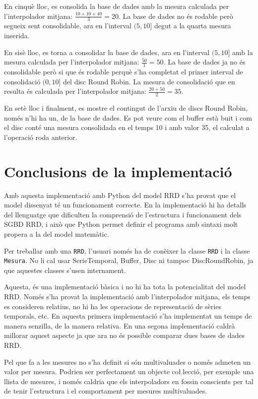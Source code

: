 En cinquè lloc, es consolida la base de dades amb la mesura calculada per l'interpolador mitjana: $\frac{10+10+40}{3}=20$. La base de dades no és rodable però segueix sent consolidable, ara en l'interval $(5,10]$ degut a la quarta mesura inserida.

En sisè lloc, es torna a consolidar la base de dades, ara en l'interval $(5,10]$ amb la mesura calculada per l'interpolador mitjana: $\frac{50}{1}=50$. La base de dades ja no és consolidable però si que és rodable perquè s'ha completat el primer interval de consolidació $(0,10]$ del disc Round Robin. La mesura de consolidació que en resulta és calculada per l'interpolador mitjana: $\frac{ 20+50 }{2} = 35$.

En setè lloc i finalment, es mostre el contingut de l'arxiu de discs Round Robin, només n'hi ha un, de la base de dades. Es pot veure com el buffer està buit i com el disc conté una mesura consolidada en el temps 10 i amb valor 35, el calculat a l'operació roda anterior.


\section[Resum]{Conclusions de la implementació}

Amb aquesta implementació amb Python del model RRD s'ha provat que el model dissenyat té un funcionament correcte. En la implementació hi ha detalls del llenguatge que dificulten la comprensió de l'estructura i funcionament dels SGBD RRD, i això que Python permet definir el programa amb sintaxi molt propera a la del model matemàtic.

Per treballar amb una \verb+RRD+, l'usuari només ha de conèixer la classe \verb+RRD+ i la classe \verb+Mesura+. No li cal usar SerieTemporal, Buffer, Disc ni tampoc DiscRoundRobin, ja que aquestes classes s'usen internament.

Aquesta, és una implementació bàsica i no hi ha tota la potencialitat del model RRD. Només s'ha provat la implementació amb l'interpolador mitjana, els temps es consideren relatius, no hi ha les operacions de representació de sèries temporals, etc.
En aquesta primera implementació s'ha implementat un temps de manera senzilla, de la manera relativa. En una segona implementació caldrà millorar aquest aspecte ja que ara no és possible comparar dues bases de dades RRD.

Pel que fa a les mesures no s'ha definit si són multivaluades o només admeten un valor per mesura. Podrien ser perfectament un objecte co\l.lecció, per exemple una llista de mesures, i només caldria que els interpoladors en fossin conscients per tal de tenir l'estructura i el comportament per mesures multivaluades.




